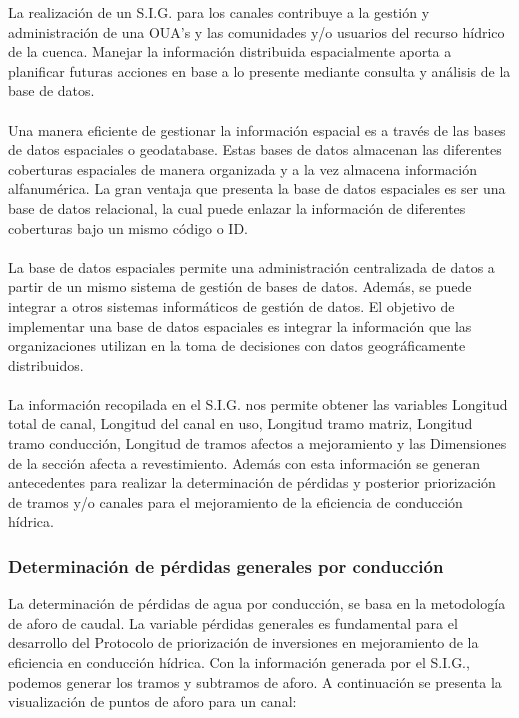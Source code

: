 \documentclass[]{article}
\begin{document}
La realización de un S.I.G. para los canales contribuye a la gestión y administración de una OUA's y las comunidades y/o usuarios del recurso hídrico de la cuenca. Manejar la información distribuida espacialmente aporta a planificar futuras acciones en base a lo presente mediante consulta y análisis de la base de datos.\\
\\
Una manera eficiente de gestionar la información espacial es a través de las bases de datos espaciales o geodatabase. Estas bases de datos almacenan las diferentes coberturas espaciales de manera organizada y a la vez almacena información alfanumérica. La gran ventaja que presenta la base de datos espaciales es ser una base de datos relacional, la cual puede enlazar la información de diferentes coberturas bajo un mismo código o ID.\\
\\
La base de datos espaciales permite una administración centralizada de datos a partir de un mismo sistema de gestión de bases de datos. Además, se puede integrar a otros sistemas informáticos de gestión de datos. El objetivo de implementar una base de datos espaciales es integrar la información que las organizaciones utilizan en la toma de decisiones con datos geográficamente distribuidos.\\
\\
La información recopilada en el S.I.G. nos permite obtener las variables Longitud total de canal, Longitud del canal en uso, Longitud tramo matriz, Longitud tramo conducción, Longitud de tramos afectos a mejoramiento y las Dimensiones de la sección afecta a revestimiento. Además con esta información se generan antecedentes para realizar la determinación de pérdidas y posterior priorización de tramos y/o canales para el mejoramiento de la eficiencia de conducción hídrica.

\subsubsection{Determinación de pérdidas generales por conducción}

La determinación de pérdidas de agua por conducción, se basa en la metodología de aforo de caudal. La variable pérdidas generales es fundamental para el desarrollo del Protocolo de priorización de inversiones en mejoramiento de la eficiencia en conducción hídrica. Con la información generada por el S.I.G., podemos generar los tramos y subtramos de aforo. A continuación se presenta la visualización de puntos de aforo para un canal:
\end{document}

